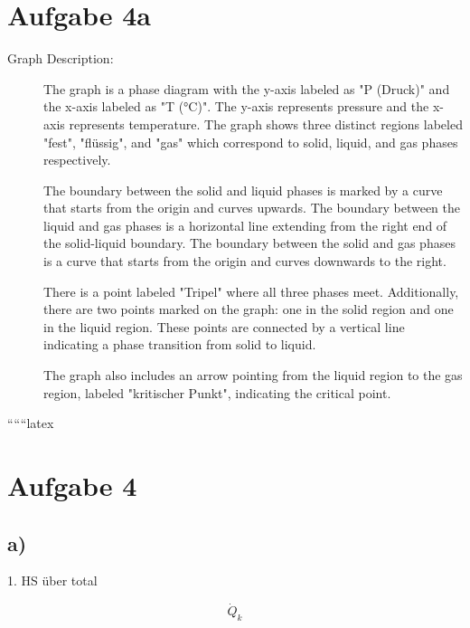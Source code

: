 \section*{Aufgabe 4a}

\begin{description}
    \item[Graph Description:] The graph is a phase diagram with the y-axis labeled as "P (Druck)" and the x-axis labeled as "T (°C)". The y-axis represents pressure and the x-axis represents temperature. The graph shows three distinct regions labeled "fest", "flüssig", and "gas" which correspond to solid, liquid, and gas phases respectively.
    
    The boundary between the solid and liquid phases is marked by a curve that starts from the origin and curves upwards. The boundary between the liquid and gas phases is a horizontal line extending from the right end of the solid-liquid boundary. The boundary between the solid and gas phases is a curve that starts from the origin and curves downwards to the right.
    
    There is a point labeled "Tripel" where all three phases meet. Additionally, there are two points marked on the graph: one in the solid region and one in the liquid region. These points are connected by a vertical line indicating a phase transition from solid to liquid.
    
    The graph also includes an arrow pointing from the liquid region to the gas region, labeled "kritischer Punkt", indicating the critical point.
\end{description}

``````latex


\section*{Aufgabe 4}



\subsection*{a)}
1. HS über total

\[
\boxed{\dot{Q}_k}
\]